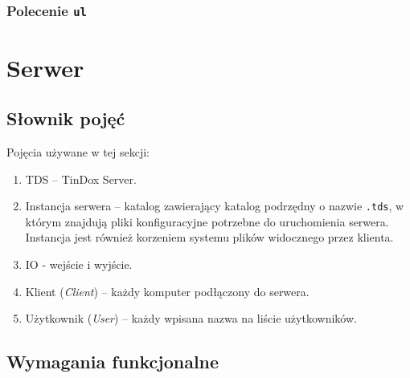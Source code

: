 \documentclass[10pt,a4paper]{article}
\begin{document}
\subsubsection{Polecenie \texttt{ul}}




\section{Serwer}

\subsection{Słownik pojęć}
\noindent Pojęcia używane w tej sekcji:
\begin{enumerate}
    \item TDS -- TinDox Server.
    \item Instancja serwera -- katalog zawierający katalog podrzędny o nazwie \texttt{.tds}, w którym znajdują pliki konfiguracyjne potrzebne do uruchomienia serwera. Instancja jest również korzeniem systemu plików widocznego przez klienta.
    \item IO - wejście i wyjście.
    \item Klient (\textit{Client}) -- każdy komputer podłączony do serwera.
    \item Użytkownik (\textit{User}) -- każdy wpisana nazwa na liście użytkowników.
\end{enumerate}

\subsection{Wymagania funkcjonalne}
\end{document}

